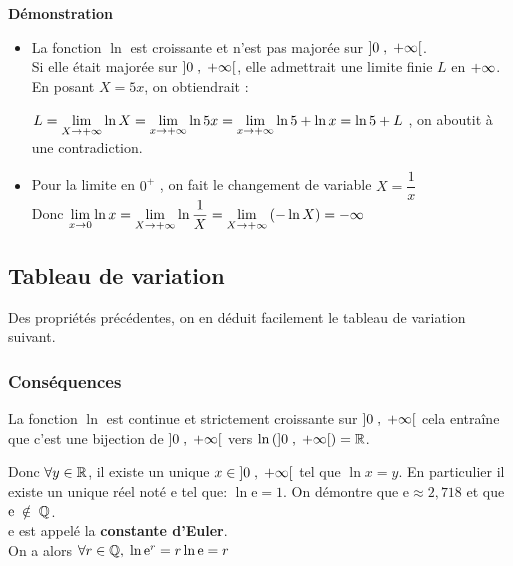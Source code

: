 \textbf{Démonstration}
\begin{itemize}
\item La fonction  $ \ln  $ est croissante et  n'est pas   majorée sur  $ \left]0 \;,\; +\infty\right[ $.\\
 Si elle était majorée sur $ \left]0 \;,\; +\infty\right[ $, elle admettrait une limite finie $L$ en
$ +\infty $. En posant $X = 5x$, on obtiendrait :

$L= \displaystyle\lim_{X \to +\infty} \ln X = \displaystyle\lim_{x \to +\infty} \ln 5x = \displaystyle\lim_{x \to +\infty} \ln 5 + \ln x = \ln 5 + L$ , on aboutit à une contradiction.
\item  Pour la limite en $ 0^{+} $ , on fait le changement de variable $ X=\dfrac{1}{x} $\\
Donc $ \displaystyle\lim_{x \to 0}\ln x=\displaystyle\lim_{X \to +\infty}\ln \dfrac{1}{X}=\displaystyle\lim_{X \to  +\infty}\left(-\ln X\right)=-\infty $
\end{itemize}


\subsection*{Tableau de variation }
Des propriétés précédentes, on en déduit facilement le tableau de variation suivant.


\begin{center}


\end{center}



\subsubsection*{Conséquences}
La fonction $ \ln  $  est continue et strictement croissante sur $ \left]0 \;,\; +\infty\right[ $  cela entraîne que c'est une bijection de $ \left]0 \;,\; +\infty\right[ $  vers $ \ln \left(  \left]0 \;,\; +\infty\right[ \right)=\mathbb{R} $.

Donc $ \forall y \in \mathbb{R} $,  il existe un unique $ x\in \left]0 \;,\; +\infty\right[ $ tel que $ \ln x=y. $  En particulier il existe un unique réel noté $ \mathrm{e} $ tel que:  $\ln \mathrm{e}=1 $.
On démontre que $ \mathrm{e}\approx 2,718 $    et que  $  \mathrm{e}\;\notin\; \mathbb{Q}$.\\  $ \mathrm{e }$ est appelé la  \textbf{ constante d'Euler}.\\
On a alors  $ \forall r \in \mathbb{Q}, \; \ln \mathrm{e}^{r}=r\ln \mathrm{e}=r $


